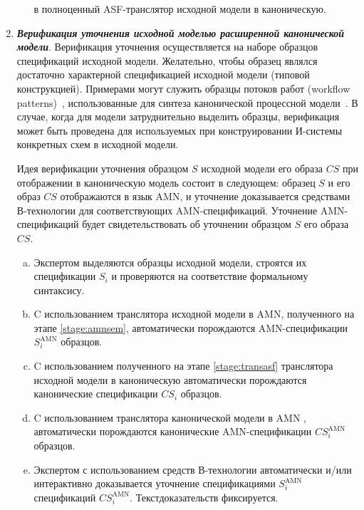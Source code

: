 \begin{multicols}{2}
\begin{enumerate}[1.]
\begin{enumerate}[(a)]
в полноценный ASF-транслятор исходной модели в каноническую.
 \end{enumerate}
 \item {\bfseries\textit{Верификация уточнения исходной моделью расширенной
канонической модели}}.
Верификация уточнения осуществляется на наборе образцов
спецификаций исходной модели. Желательно, чтобы образец являлся
достаточно характерной спецификацией исходной модели (типовой конструкцией).
Примерами могут служить образцы потоков работ (workflow patterns)~\cite{Aa03},
использованные для синтеза канонической процессной модели~\cite{Ka05-3}.
В случае, когда для модели затруднительно выделить образцы,
верификация может быть проведена для
используемых при конструировании И-системы конкретных схем в исходной модели.

\hspace*{\itemindent}\hspace*{\labelwidth}%
Идея верификации уточнения образцом $S$ исходной модели его образа $CS$ при
отображении в каноническую модель состоит в следующем: образец $S$ и его образ $CS$
отображаются в язык AMN, и уточнение доказывается средствами В-тех\-но\-ло\-гии для
соответствующих AMN-спе\-ци\-фи\-ка\-ций. Уточнение AMN-спе\-ци\-фи\-ка\-ций будет
свидетельствовать об уточнении образцом $S$ его образа $CS$.
\begin{enumerate}[(a)]
\item \label{stage:samplespec}
Экспертом выделяются образцы исходной модели, строятся их спецификации $S_i$
и проверяются на соответствие формальному синтаксису.
\item \label{stage:sampleamn}
C использованием транслятора исходной модели в AMN, полученного на этапе
\ref{stage:amnsem},
автоматически порождаются AMN-спе\-ци\-фи\-ка\-ции $S_i^{\mathrm{AMN}}$ образцов.
\item \label{stage:samplecanspec}
C использованием полученного на этапе \ref{stage:transasf}
транслятора исходной модели в каноническую
автоматически порождаются канонические спецификации $CS_i$ образцов.
\item \label{stage:samplecanamnspec}
C использованием транслятора канонической модели в AMN \cite{sb05-amn},
автоматически порождаются канонические AMN-спе\-ци\-фи\-ка\-ции
$CS_i^{\mathrm{AMN}}$ образцов.
\item \label{stage:sampleproof}
Экспертом с использованием средств В-тех\-но\-ло\-гии автоматически и/или
интерактивно доказывается уточнение спецификациями $S_i^{\mathrm{AMN}}$
спецификаций $CS_i^{\mathrm{AMN}}$. Текст\linebreak доказательств фиксируется.
 \end{enumerate}
 \end{enumerate}


\end{multicols}
